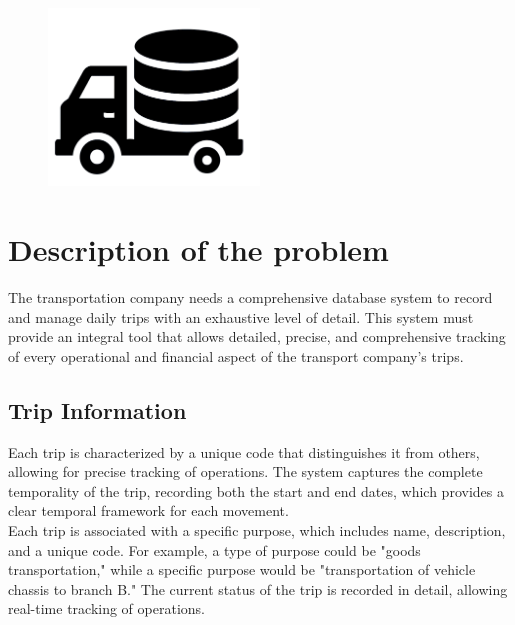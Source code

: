 \documentclass[11pt, a4paper]{article}
\title{\normalfont\spacedallcaps{Database design for transportation company}}
\author{\spacedlowsmallcaps{CarlosFOL}}
\date{}
\begin{document}

\maketitle



\tableofcontents

\vspace{2in}

\begin{figure}[h!]
    \centering
    \includegraphics[width=0.5\textwidth]{img/logo.png}
    \label{logo_db}
\end{figure}


\newpage


\section{Description of the problem}

The transportation company needs a comprehensive database system to record and manage daily trips with an exhaustive level of detail. This system must provide an integral tool that allows detailed, precise, and comprehensive tracking of every operational and financial aspect of the transport company's trips.\\

\subsection*{Trip Information}
Each trip is characterized by a unique code that distinguishes it from others, allowing for precise tracking of operations. The system captures the complete temporality of the trip, recording both the start and end dates, which provides a clear temporal framework for each movement.\\

Each trip is associated with a specific purpose, which includes name, description, and a unique code. For example, a type of purpose could be "goods transportation," while a specific purpose would be "transportation of vehicle chassis to branch B." The current status of the trip is recorded in detail, allowing real-time tracking of operations.\\
\end{document}
